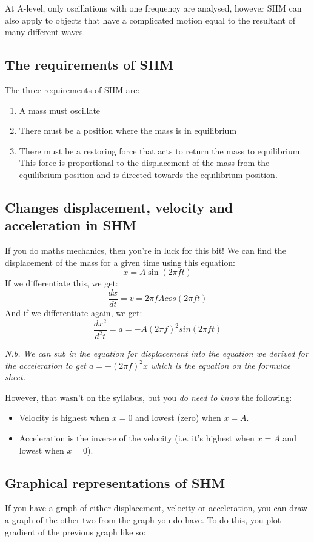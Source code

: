 \documentclass{article}
\begin{document}
At A-level, only oscillations with one frequency are analysed, however SHM can also apply to objects that have a complicated motion equal to the resultant of many different waves.

\subsection*{The requirements of SHM}
The three requirements of SHM are:
\begin{enumerate}
	\item A mass must oscillate
	\item There must be a position where the mass is in equilibrium
	\item There must be a restoring force that acts to return the mass to equilibrium. This force is proportional to the displacement of the mass from the equilibrium position and is directed towards the equilibrium position.
\end{enumerate}

\subsection*{Changes displacement, velocity and acceleration in SHM}
If you do maths mechanics, then you're in luck for this bit!
We can find the displacement of the mass for a given time using this equation:
\[
	x = A\sin (2 \pi ft)
\]
If we differentiate this, we get:
\[
	\frac{dx}{dt} = v = 2 \pi f A cos(2 \pi f t)
\]
And if we differentiate again, we get:
\[
	\frac{dx^2}{d^2t} = a = - A (2 \pi f)^2 sin(2 \pi f t)
\]

\textit{N.b. We can sub in the equation for displacement into the equation we derived for the acceleration to get $a= -(2 \pi f)^2 x$ which is the equation on the formulae sheet.}

However, that wasn't on the syllabus, but you \textit{do need to know} the following:
\begin{itemize}
	\item Velocity is highest when $x=0$ and lowest (zero) when $x=A$.
	\item Acceleration is the inverse of the velocity (i.e. it's highest when $x=A$ and lowest when $x=0$).
\end{itemize}

\subsection*{Graphical representations of SHM}
If you have a graph of either displacement, velocity or acceleration, you can draw a graph of the other two from the graph you do have. To do this, you plot gradient of the previous graph like so:
\end{document}
